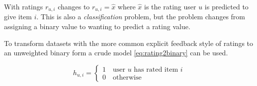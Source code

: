 With ratings $r_{u, i}$ changes to $r_{u, i} = \hat{x}$ where $\hat{x}$ is the rating user $u$ is predicted to give item $i$. This is also a \textit{classification} problem, but the problem changes from assigning a binary value to wanting to predict a rating value.

To transform datasets with the more common explicit feedback style of ratings to an unweighted binary form a crude model \eqref{eq:rating2binary} can be used.

\begin{equation} \label{eq:rating2binary}
    h_{u, i} = \begin{cases}
        1 \quad \text{user $u$ has rated item $i$} \\
        0 \quad \text{otherwise}
    \end{cases}
\end{equation}

